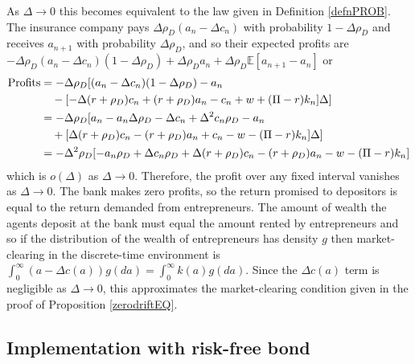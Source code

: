 \documentclass[11pt]{article}
\theoremstyle{plain}
\theoremstyle{definition} %
\begin{document}
As $\Delta \rightarrow 0$ this becomes equivalent to the law given in Definition \ref{defnPROB}. The insurance company pays $\Delta \rho_D(a_n - \Delta c_n)$ with probability $1-\Delta \rho_D$ and receives $a_{n+1}$ with probability $\Delta \rho_D$, and so their expected profits are $-\Delta \rho_D(a_n - \Delta c_n)(1-\Delta \rho_D) + \Delta \rho_Da_n + \Delta \rho_D\mathbb{E}[a_{n+1} - a_n] $ or
\begin{align*}
\textnormal{Profits} & =  -\Delta \rho_D [(a_n - \Delta c_n)(1-\Delta \rho_D) - a_n
\\ & \ \ \  -[-\Delta(r+\rho_D) c_n + (r+\rho_D)a_n -  c_n + w + (\Pi - r)k_n]\Delta]
\\ & =  -\Delta \rho_D [a_n - a_n\Delta \rho_D - \Delta c_n + \Delta^2 c_n\rho_D - a_n
\\ & \ \ \  +[\Delta(r+\rho_D) c_n - (r+\rho_D)a_n +  c_n - w - (\Pi - r)k_n]\Delta]
\\ & = -\Delta^2 \rho_D [ - a_n \rho_D + \Delta c_n \rho_D + \Delta (r + \rho_D) c_n - (r + \rho_D) a_n - w - (\Pi - r)k_n]
\end{align*} %
which is $o(\Delta)$ as $\Delta \rightarrow 0$. Therefore, the profit over any fixed interval vanishes as $\Delta \rightarrow 0$. The bank makes zero profits, so the return promised to depositors is equal to the return demanded from entrepreneurs. The amount of wealth the agents deposit at the bank must equal the amount rented by entrepreneurs and so if the distribution of the wealth of entrepreneurs has density $g$ then market-clearing in the discrete-time environment is $\int_0^{\infty}(a - \Delta c(a))g(da) = \int_{0}^{\infty}k(a)g(da)$. Since the $\Delta c(a)$ term is negligible as $\Delta \rightarrow 0$, this approximates the market-clearing condition given in the proof of Proposition \ref{zerodriftEQ}. 

\subsection{Implementation with risk-free bond} \label{decentDT}
\end{document}
